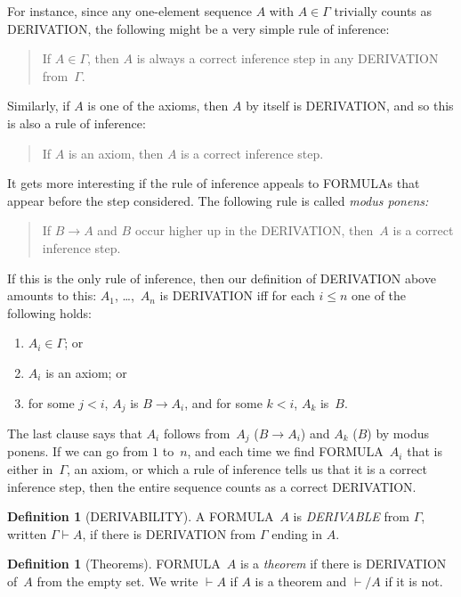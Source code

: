 \documentclass[10pt,a4paper]{article}
\newcommand*{\olup}[1]{\MakeUppercase{#1}}
\theoremstyle{plain}
\theoremstyle{definition}
\newtheorem{defn}[thm]{Definition}
\theoremstyle{remark}
\providecommand{\lif}{\mathbin{\rightarrow}}
\providecommand{\Proves}{\mathrel{\vdash}}
\begin{document}
For instance, since any one-element sequence $A$ with $A \in \Gamma$
trivially counts as \olup{derivation}, the following might be a very
simple rule of inference:
\begin{quote}
  If $A \in \Gamma$, then $A$ is always a correct inference step in
  any \olup{derivation} from~$\Gamma$.
\end{quote}
Similarly, if $A$ is one of the axioms, then $A$ by itself is
\olup{derivation}, and so this is also a rule of inference:
\begin{quote}
  If $A$ is an axiom, then $A$ is a correct inference step.
\end{quote}
It gets more interesting if the rule of inference appeals to
\olup{formula}s that appear before the step considered. The following
rule is called \emph{modus ponens:}
\begin{quote}
  If $B \lif A$ and $B$ occur higher up in the \olup{derivation},
  then~$A$ is a correct inference step.
\end{quote}
If this is the only rule of inference, then our definition of
\olup{derivation} above amounts to this: $A_1$, \dots,~$A_n$ is
\olup{derivation} iff for each $i \le n$ one of the following holds:
\begin{enumerate}
\item $A_i \in \Gamma$; or
\item $A_i$ is an axiom; or
\item for some $j < i$, $A_j$ is $B \lif A_i$, and for some $k < i$,
  $A_k$ is~$B$.
\end{enumerate}
The last clause says that $A_i$ follows from~$A_j$ ($B \lif A_i$) and $A_k$
($B$) by modus ponens. If we can go from $1$ to~$n$, and
each time we find \olup{formula}~$A_i$ that is either in~$\Gamma$, an
axiom, or which a rule of inference tells us that it is a correct
inference step, then the entire sequence counts as a correct
\olup{derivation}.

\begin{defn}[\olup{derivability}]
A \olup{formula}~$A$ is \emph{\olup{derivable}} from $\Gamma$, written
$\Gamma \Proves A$, if there is \olup{derivation} from $\Gamma$ ending
in $A$.
\end{defn}

\begin{defn}[Theorems]
\olup{formula}~$A$ is a \emph{theorem} if there is \olup{derivation}
of~$A$ from the empty set.  We write $\Proves A$ if $A$ is a
theorem and $\Proves/ A$ if it is not.
\end{defn}
\end{document}
